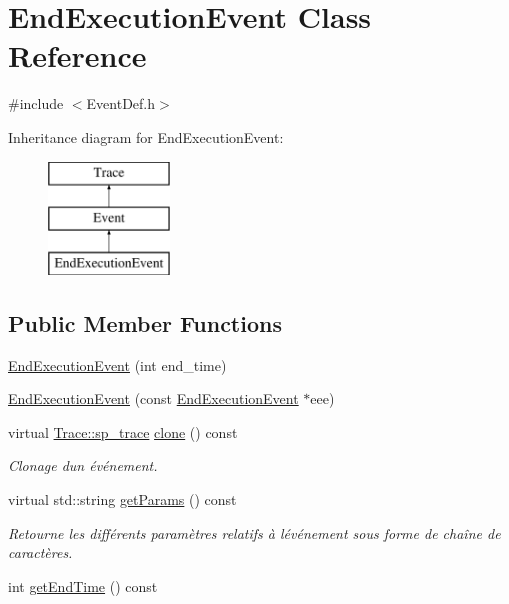 \hypertarget{class_end_execution_event}{}\section{End\+Execution\+Event Class Reference}
\label{class_end_execution_event}


{\ttfamily \#include $<$Event\+Def.\+h$>$}

Inheritance diagram for End\+Execution\+Event\+:\begin{figure}[H]
\begin{center}
\leavevmode
\includegraphics[height=3.000000cm]{class_end_execution_event}
\end{center}
\end{figure}
\subsection*{Public Member Functions}
\begin{DoxyCompactItemize}
\item 
\hyperlink{class_end_execution_event_a335a6695120ff70522e6b8ede3981fe9}{End\+Execution\+Event} (int end\+\_\+time)
\item 
\hyperlink{class_end_execution_event_aee725cbd3b770e439983e0174e8466ad}{End\+Execution\+Event} (const \hyperlink{class_end_execution_event}{End\+Execution\+Event} $\ast$eee)
\item 
virtual \hyperlink{class_trace_a9c58e523529fc8a03fb6acf3eef86150}{Trace\+::sp\+\_\+trace} \hyperlink{class_end_execution_event_aa89f0e0da951077ac408345235b7444b}{clone} () const 
\begin{DoxyCompactList}\small\item\em Clonage d\textquotesingle{}un événement. \end{DoxyCompactList}\item 
virtual std\+::string \hyperlink{class_end_execution_event_a8676ace3828d6b5914d76e90ec9a7105}{get\+Params} () const 
\begin{DoxyCompactList}\small\item\em Retourne les différents paramètres relatifs à l\textquotesingle{}événement sous forme de chaîne de caractères. \end{DoxyCompactList}\item 
int \hyperlink{class_end_execution_event_ae3642d03e060c6379a5149f9aef6d810}{get\+End\+Time} () const 
\end{DoxyCompactItemize}
